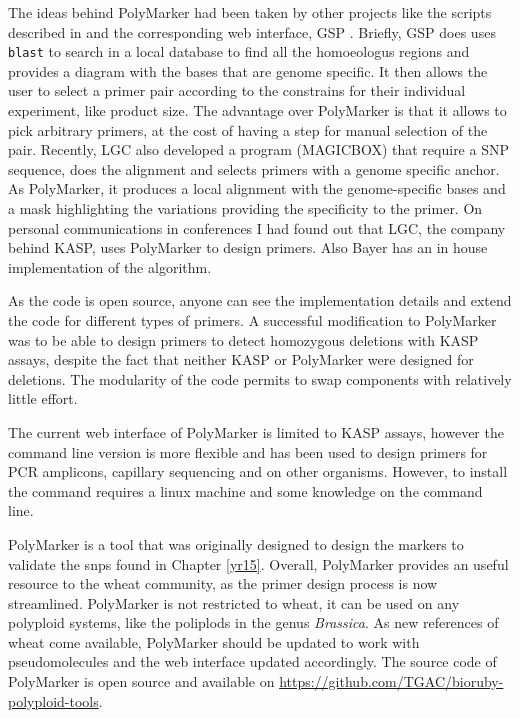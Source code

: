 
The ideas behind PolyMarker had been taken by other projects like the scripts described in \cite{Ma2015} and the corresponding web interface, GSP \citep{Wang2016}. 
Briefly, GSP does uses \verb|blast| to search in a local database to find all the homoeologus regions and provides a diagram with the bases that are genome specific. 
It then allows the user to select a primer pair according to the constrains for their individual experiment, like product size. 
The advantage over PolyMarker is that it allows to pick arbitrary primers, at the cost of having a step for manual selection of the pair. 
Recently, LGC also developed a program (MAGICBOX) that require a SNP sequence, does the alignment and selects primers with a genome specific anchor. 
As PolyMarker, it produces a local alignment with the genome-specific bases \citep{Curry2016} and a mask highlighting the variations providing the specificity to the primer.
On personal communications in conferences I had found out that LGC, the company behind KASP, uses PolyMarker to design primers. Also Bayer has an in house implementation of the algorithm. 

As the code is open source, anyone can see the implementation details and extend the code for different types of primers. 
A successful modification to PolyMarker was to be able to design primers to detect homozygous deletions with KASP assays, despite the fact that neither KASP or PolyMarker were designed for deletions. 
The modularity of the code permits to swap components with relatively little effort. 

The current web interface of PolyMarker is limited to KASP assays, however the command line version is more flexible and has been used to design primers for PCR amplicons, capillary sequencing and on other organisms. 
However, to install the command requires a linux machine and some knowledge on the command line. 

PolyMarker is a tool that was originally designed to design the markers to validate the \glspl{snp} found in Chapter \ref{yr15}. 
Overall, PolyMarker provides an useful resource to the wheat community, as the primer design process is now streamlined. 
PolyMarker is not restricted to wheat, it can be used on any polyploid systems, like the poliplods in the genus \textit{Brassica}.
As new references of wheat come available, PolyMarker should be updated to work with pseudomolecules and the web interface updated accordingly. The source code of PolyMarker is open source and available on \url{https://github.com/TGAC/bioruby-polyploid-tools}. 
